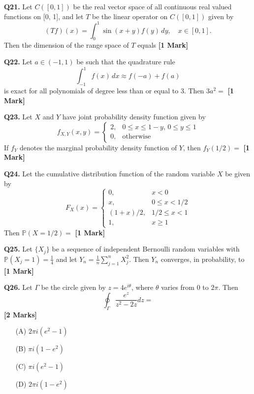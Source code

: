\documentclass[11pt]{article}
\newcommand{\questiona}[2]{
    \noindent\textbf{Q#2.} #1 \hfill \textbf{[1 Mark]}
}
\newcommand{\questionb}[2]{
    \noindent\textbf{Q#2.} #1 \hfill \textbf{[2 Marks]}
}
\begin{document}
\questiona{Let \( C([0, 1]) \) be the real vector space of all continuous real valued functions on [0, 1], and let \( T \) be the linear operator on \( C([0, 1]) \) given by \[ (Tf)(x) = \int_0^1 \sin(x + y)f(y) \, dy, \quad x \in [0, 1]. \] Then the dimension of the range space of \( T \) equals}{21}
\vspace{0.5cm}

\questiona{Let \( a \in (-1, 1) \) be such that the quadrature rule \[ \int_{-1}^{1} f(x)\, dx \approx f(-a) + f(a) \] is exact for all polynomials of degree less than or equal to 3. Then \( 3a^2 = \)}{22}
\vspace{0.5cm}

\questiona{Let \( X \) and \( Y \) have joint probability density function given by \[
f_{X,Y}(x, y) = \begin{cases}
2, & 0 \le x \le 1 - y,\, 0 \le y \le 1 \\
0, & \text{otherwise}
\end{cases}
\] If \( f_Y \) denotes the marginal probability density function of \( Y \), then \( f_Y(1/2) = \)}{23}
\vspace{0.5cm}

\questiona{Let the cumulative distribution function of the random variable \( X \) be given by
\[
F_X(x) =
\begin{cases}
0, & x < 0 \\
x, & 0 \le x < 1/2 \\
(1 + x)/2, & 1/2 \le x < 1 \\
1, & x \ge 1
\end{cases}
\]
Then \( \mathbb{P}(X = 1/2) = \)}{24}
\vspace{0.5cm}

\questiona{Let \( \{X_j\} \) be a sequence of independent Bernoulli random variables with \( \mathbb{P}(X_j = 1) = \frac{1}{4} \) and let \( Y_n = \frac{1}{n} \sum_{j=1}^{n} X_j^2 \). Then \( Y_n \) converges, in probability, to}{25}
\vspace{0.5cm}

\questionb{Let \( \Gamma \) be the circle given by \( z = 4e^{i\theta} \), where \( \theta \) varies from 0 to \( 2\pi \). Then \[ \oint_{\Gamma} \frac{e^z}{z^2 - 2z} dz = \]}{26}
\begin{enumerate}
    \item[(A)] \( 2\pi i (e^2 - 1) \)
    \item[(B)] \( \pi i (1 - e^2) \)
    \item[(C)] \( \pi i (e^2 - 1) \)
    \item[(D)] \( 2\pi i (1 - e^2) \)
\end{enumerate}
\vspace{0.5cm}
\end{document}
